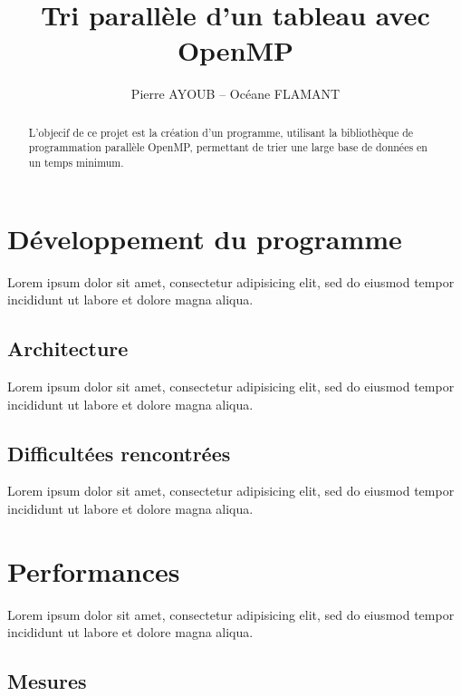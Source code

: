 \documentclass[12pt]{article}
\begin{document}
\title{Tri parallèle d'un tableau avec OpenMP}
\author{Pierre AYOUB -- Océane FLAMANT}

\maketitle

\tableofcontents

\newpage

\begin{abstract}
    L'objecif de ce projet est la création d'un programme, utilisant la
    bibliothèque de programmation parallèle OpenMP, permettant de trier une
    large base de données en un temps minimum.
\end{abstract}

\section{Développement du programme}

Lorem ipsum dolor sit amet, consectetur adipisicing elit, sed do eiusmod tempor
incididunt ut labore et dolore magna aliqua.

\subsection{Architecture}

Lorem ipsum dolor sit amet, consectetur adipisicing elit, sed do eiusmod tempor
incididunt ut labore et dolore magna aliqua.

\subsection{Difficultées rencontrées}

Lorem ipsum dolor sit amet, consectetur adipisicing elit, sed do eiusmod tempor
incididunt ut labore et dolore magna aliqua.

\section{Performances}

Lorem ipsum dolor sit amet, consectetur adipisicing elit, sed do eiusmod tempor
incididunt ut labore et dolore magna aliqua.

\subsection{Mesures}
\end{document}
